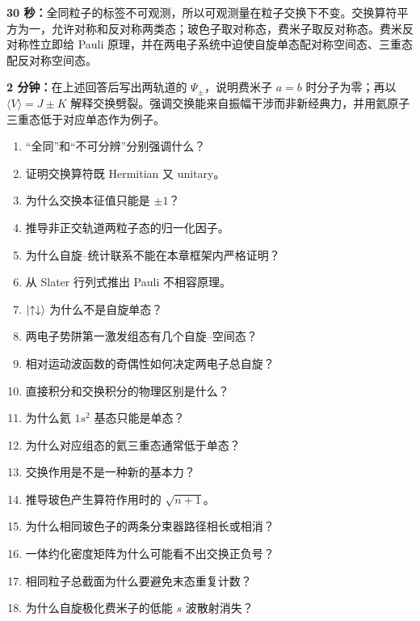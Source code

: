\begin{interviewbox}
\textbf{30 秒：}全同粒子的标签不可观测，所以可观测量在粒子交换下不变。交换算符平方为一，允许对称和反对称两类态；玻色子取对称态，费米子取反对称态。费米反对称性立即给 Pauli 原理，并在两电子系统中迫使自旋单态配对称空间态、三重态配反对称空间态。

\textbf{2 分钟：}在上述回答后写出两轨道的 $\Psi_\pm$，说明费米子 $a=b$ 时分子为零；再以
$\langle V\rangle=J\pm K$ 解释交换劈裂。强调交换能来自振幅干涉而非新经典力，并用氦原子三重态低于对应单态作为例子。
\end{interviewbox}

\begin{selftestbox}
\begin{enumerate}
\item “全同”和“不可分辨”分别强调什么？
\item 证明交换算符既 Hermitian 又 unitary。
\item 为什么交换本征值只能是 $\pm1$？
\item 推导非正交轨道两粒子态的归一化因子。
\item 为什么自旋--统计联系不能在本章框架内严格证明？
\item 从 Slater 行列式推出 Pauli 不相容原理。
\item $\left|\uparrow\downarrow\right\rangle$ 为什么不是自旋单态？
\item 两电子势阱第一激发组态有几个自旋--空间态？
\item 相对运动波函数的奇偶性如何决定两电子总自旋？
\item 直接积分和交换积分的物理区别是什么？
\item 为什么氦 $1s^2$ 基态只能是单态？
\item 为什么对应组态的氦三重态通常低于单态？
\item 交换作用是不是一种新的基本力？
\item 推导玻色产生算符作用时的 $\sqrt{n+1}$。
\item 为什么相同玻色子的两条分束器路径相长或相消？
\item 一体约化密度矩阵为什么可能看不出交换正负号？
\item 相同粒子总截面为什么要避免末态重复计数？
\item 为什么自旋极化费米子的低能 $s$ 波散射消失？
\end{enumerate}
\end{selftestbox}
